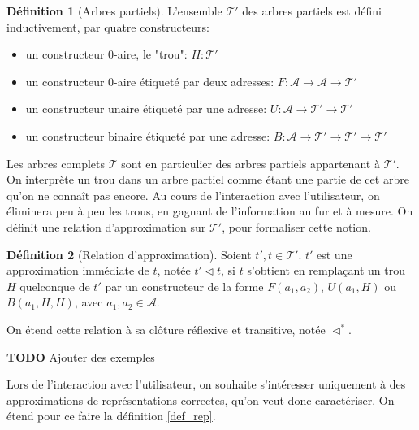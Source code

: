 \documentclass[11pt,a4paper]{article}
\theoremstyle{plain}
\theoremstyle{definition}
\newtheorem{definition}{Définition}
\theoremstyle{remark}
\newcommand*{\addresses}{\ensuremath{\mathcal{A}}}
\newcommand*{\trees}{\ensuremath{\mathcal{T}}}
\newcommand*{\treespartial}{\ensuremath{\mathcal{T'}}}
\newcommand*{\relapprox}{\ensuremath{\triangleleft}}
\newcommand*{\relapproxlarge}{\ensuremath{\relapprox^*}}
\newcommand*{\unknown}{H}
\newcommand*{\todo}{{\normalfont \textbf{TODO}} }
\begin{document}
\begin{definition}[Arbres partiels]
    L'ensemble \treespartial{} des arbres partiels est défini inductivement, par quatre constructeurs:
    \begin{itemize}
      \item un constructeur $0$-aire, le "trou": $\unknown: \treespartial$
      \item un constructeur $0$-aire étiqueté par deux adresses: $F: \mathcal{A} \rightarrow \mathcal{A} \rightarrow \treespartial$
      \item un constructeur unaire étiqueté par une adresse: $U: \mathcal{A} \rightarrow \treespartial \rightarrow \treespartial$
      \item un constructeur binaire étiqueté par une adresse: $B: \mathcal{A} \rightarrow \treespartial \rightarrow \treespartial \rightarrow \treespartial$
    \end{itemize}
\end{definition}

Les arbres complets \trees{} sont en particulier des arbres partiels appartenant à \treespartial{}. On interprète un trou dans un arbre partiel comme étant une partie de cet arbre qu'on ne connaît pas encore. Au cours de l'interaction avec l'utilisateur, on éliminera peu à peu les trous, en gagnant de l'information au fur et à mesure. On définit une relation d'approximation sur \treespartial{}, pour formaliser cette notion.

\begin{definition}[Relation d'approximation]
    Soient $t', t \in \treespartial$. $t'$ est une approximation immédiate de $t$, notée $t' \relapprox t$, si $t$ s'obtient en remplaçant un trou $\unknown$ quelconque de $t'$ par un constructeur de la forme $F(a_1, a_2)$, $U(a_1, \unknown)$ ou $B(a_1, \unknown, \unknown)$, avec $a_1, a_2 \in \addresses$.

    On étend cette relation à sa clôture réflexive et transitive, notée $\relapproxlarge$.
\end{definition}
\todo{Ajouter des exemples}

Lors de l'interaction avec l'utilisateur, on souhaite s'intéresser uniquement à des approximations de représentations correctes, qu'on veut donc caractériser. On étend pour ce faire la définition \ref{def_rep}.
\end{document}
